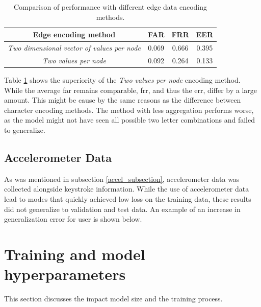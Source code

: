 \begin{center}
	\begin{table}[H]
		\begin{center}
			\begin{tabular}{ |c|c|c|c| } 
				\hline
				Edge encoding method & FAR & FRR & EER \\
				\hline
				\textit{Two dimensional vector of values per node} & 0.069 & 0.666 & 0.395 \\
				\hline
				\textit{Two values per node} & 0.092 & 0.264 & 0.133 \\
				\hline
			\end{tabular}
		\end{center}
		\caption{Comparison of performance with different edge data encoding methods.}
		\label{table:egde_encoding_comp}
	\end{table}
\end{center}

Table \ref{table:egde_encoding_comp} shows the superiority of the \textit{Two values per node} encoding method. While the average far remains comparable, frr, and thus the err, differ by a large amount. This might be cause by the same reasons as the difference between character encoding methods. The method with less aggregation performs worse, as the model might not have seen all possible two letter combinations and failed to generalize.

\subsection{Accelerometer Data}
As was mentioned in subsection \ref{accel_subsection}, accelerometer data was collected alongside keystroke information. While the use of accelerometer data lead to modes that quickly achieved low loss on the training data, these results did not generalize to validation and test data. An example of an increase in generalization error for user  is shown below.

\section{Training and model hyperparameters}
This section discusses the impact model size and the training process.

